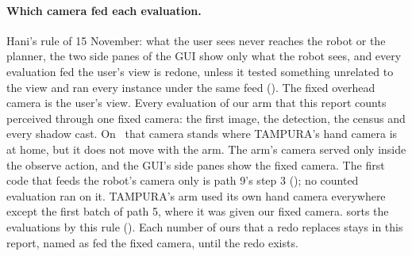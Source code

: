 \paragraph{Which camera fed each evaluation.} Hani's rule of 15 November: what the user
sees never reaches the robot or the planner, the two side panes of the GUI show only
what the robot sees, and every evaluation fed the user's view is redone, unless it
tested something unrelated to the view and ran every instance under the same feed
(). The fixed overhead camera is the user's view. Every
evaluation of our arm that this report counts perceived through one fixed camera: the
first image, the detection, the census and every shadow cast. On \fdice\ that camera
stands where TAMPURA's hand camera is at home, but it does not move with the arm. The
arm's camera served only inside the observe action, and the GUI's side panes show the
fixed camera. The first code that feeds the robot's camera only is path 9's step 3
(); no counted evaluation ran on it. TAMPURA's arm used its own hand camera
everywhere except the first batch of path 5, where it was given our fixed camera.
 sorts the evaluations by this rule (). Each
number of ours that a redo replaces stays in this report, named as fed the fixed
camera, until the redo exists.

